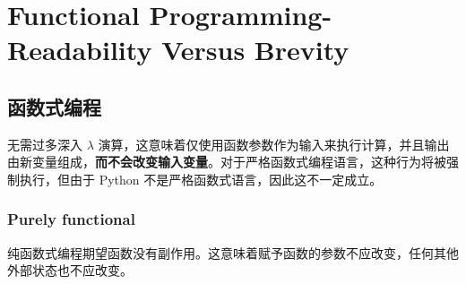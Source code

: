 \chapter{Functional Programming-Readability Versus Brevity\label{Ch05}}
\section{函数式编程}
无需过多深入 $\lambda$ 演算，这意味着仅使用函数参数作为输入来执行计算，并且输出由新变量组成，\textbf{而不会改变输入变量}。对于严格函数式编程语言，这种行为将被强制执行，但由于 Python 不是严格函数式语言，因此这不一定成立。
\subsection{Purely functional}
纯函数式编程期望函数没有副作用。这意味着赋予函数的参数不应改变，任何其他外部状态也不应改变。